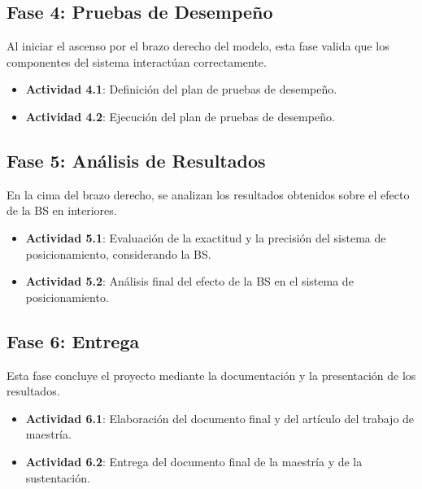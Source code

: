 \subsection{Fase 4: Pruebas de Desempeño}
Al iniciar el ascenso por el brazo derecho del modelo, esta fase valida que los componentes del sistema interactúan correctamente.
\begin{itemize}
    \item \textbf{Actividad 4.1}: Definición del plan de pruebas de desempeño.
    \item \textbf{Actividad 4.2}: Ejecución del plan de pruebas de desempeño.
\end{itemize}

\subsection{Fase 5: Análisis de Resultados}
En la cima del brazo derecho, se analizan los resultados obtenidos sobre el efecto de la BS en interiores.
%
\begin{itemize}
    \item \textbf{Actividad 5.1}: Evaluación de la exactitud y la precisión del sistema de posicionamiento, considerando la BS.
    \item \textbf{Actividad 5.2}: Análisis final del efecto de la BS en el sistema de posicionamiento.
\end{itemize}

\subsection{Fase 6: Entrega}
Esta fase concluye el proyecto mediante la documentación y la presentación de los resultados.
\begin{itemize}
    \item \textbf{Actividad 6.1}: Elaboración del documento final y del artículo del trabajo de maestría.
    \item \textbf{Actividad 6.2}: Entrega del documento final de la maestría y de la sustentación.
\end{itemize}


